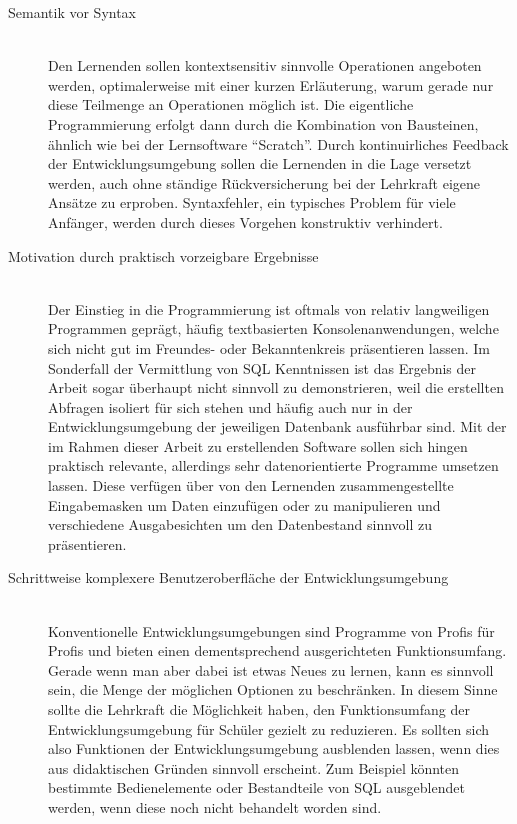 \begin{description}
\item[Semantik vor Syntax] \hfill\\
  Den Lernenden sollen kontextsensitiv sinnvolle Operationen angeboten werden, optimalerweise mit einer kurzen Erläuterung, warum gerade nur diese Teilmenge an Operationen möglich ist. Die eigentliche Programmierung erfolgt dann durch die Kombination von Bausteinen, ähnlich wie bei der Lernsoftware ``Scratch''. Durch kontinuirliches Feedback der Entwicklungsumgebung sollen die Lernenden in die Lage versetzt werden, auch ohne ständige Rückversicherung bei der Lehrkraft eigene Ansätze zu erproben. Syntaxfehler, ein typisches Problem für viele Anfänger, werden durch dieses Vorgehen konstruktiv verhindert.
\item[Motivation durch praktisch vorzeigbare Ergebnisse] \hfill\\
  Der Einstieg in die Programmierung ist oftmals von relativ langweiligen Programmen geprägt, häufig textbasierten Konsolenanwendungen, welche sich nicht gut im Freundes- oder Bekanntenkreis präsentieren lassen. Im Sonderfall der Vermittlung von SQL Kenntnissen ist das Ergebnis der Arbeit sogar überhaupt nicht sinnvoll zu demonstrieren, weil die erstellten Abfragen isoliert für sich stehen und häufig auch nur in der Entwicklungsumgebung der jeweiligen Datenbank ausführbar sind. Mit der im Rahmen dieser Arbeit zu erstellenden Software sollen sich hingen praktisch relevante, allerdings sehr datenorientierte Programme umsetzen lassen. Diese verfügen über von den Lernenden zusammengestellte Eingabemasken um Daten einzufügen oder zu manipulieren und verschiedene Ausgabesichten um den Datenbestand sinnvoll zu präsentieren.
\item[Schrittweise komplexere Benutzeroberfläche der Entwicklungsumgebung] \hfill \\
  Konventionelle Entwicklungsumgebungen sind Programme von Profis für Profis und bieten einen dementsprechend ausgerichteten Funktionsumfang. Gerade wenn man aber dabei ist etwas Neues zu lernen, kann es sinnvoll sein, die Menge der möglichen Optionen zu beschränken. In diesem Sinne sollte die Lehrkraft die Möglichkeit haben, den Funktionsumfang der Entwicklungsumgebung für Schüler gezielt zu reduzieren. Es sollten sich also Funktionen der Entwicklungsumgebung ausblenden lassen, wenn dies aus didaktischen Gründen sinnvoll erscheint. Zum Beispiel könnten bestimmte Bedienelemente oder Bestandteile von SQL ausgeblendet werden, wenn diese noch nicht behandelt worden sind.

\end{description}
